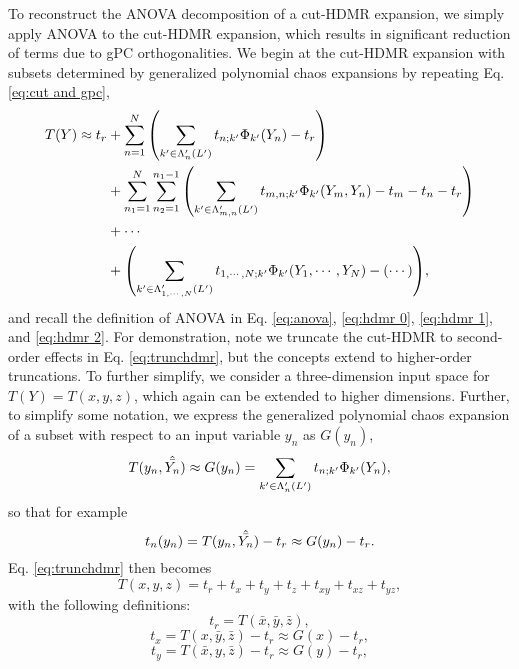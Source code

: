 To reconstruct the ANOVA decomposition of a cut-HDMR expansion, we simply apply ANOVA to the cut-HDMR
expansion, which results in significant reduction of terms due to gPC orthogonalities.
We begin at the cut-HDMR expansion with
subsets determined by generalized polynomial chaos expansions by repeating Eq. \ref{eq:cut and gpc},
\begin{align}\label{eq:trunchdmr}
  T(Y) \approx t_r &+ \sum_{n=1}^N \qty(\sum_{k'\in\Lambda_n'(L')} t_{n;k'}\Phi_{k'}(Y_n)-t_r) \\ \nonumber
  &+ \sum_{n_1=1}^N \sum_{n_2=1}^{n_1-1} \qty(\sum_{k'\in\Lambda_{m,n}'(L')} t_{m,n;k'}\Phi_{k'}(Y_m,Y_n)
-t_m -t_n - t_r)\\
  \nonumber &+\cdots \\ \nonumber
  &+ \qty(\sum_{k'\in\Lambda_{1,\cdots,N}'(L')} t_{1,\cdots,N;k'}\Phi_{k'}(Y_1,\cdots,Y_N) - (\cdots)),
\end{align}
and recall the definition of ANOVA in Eq. \ref{eq:anova}, \ref{eq:hdmr 0}, \ref{eq:hdmr 1}, and \ref{eq:hdmr 2}.
For demonstration, note we truncate the cut-HDMR to second-order effects in Eq. \ref{eq:trunchdmr}, but the 
concepts extend to higher-order truncations.  To further simplify, we consider a three-dimension
input space for $T(Y) = T(x,y,z)$, which again can be extended to higher dimensions.  Further,
to simplify some notation, we express the generalized polynomial chaos expansion of a subset with respect
to an input variable $y_n$ as $G(y_n)$,
\begin{equation}
  T(y_n,\hat{\bar{{Y_n}}}) \approx G(y_n) = \sum_{k'\in\Lambda_n'(L')} t_{n;k'}\Phi_{k'}(Y_n),
\end{equation}
so that for example
\begin{equation}
  t_n(y_n) = T(y_n,\hat{\bar{{Y_n}}}) - t_r \approx G(y_n) - t_r.
\end{equation}
Eq. \ref{eq:trunchdmr} then becomes
\begin{equation}
  T(x,y,z) = t_r + t_x + t_y + t_z + t_{xy} + t_{xz} + t_{yz},
\end{equation}
with the following definitions:
\begin{equation}
  t_r = T(\bar x, \bar y, \bar z),
\end{equation}
\begin{equation}
  t_x = T(x, \bar y, \bar z) - t_r \approx G(x) - t_r,
\end{equation}
\begin{equation}
  t_y = T(\bar x, y, \bar z) - t_r \approx G(y) - t_r,
\end{equation}
